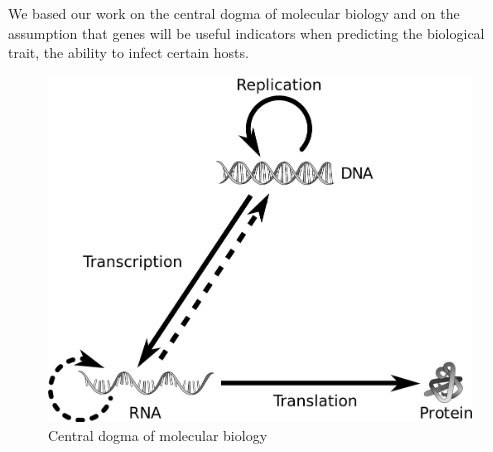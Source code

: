 We based our work on the central dogma of molecular biology and on the assumption that genes will be useful indicators when predicting the biological trait, the ability to infect certain hosts.

\begin{figure}[htp]
\includegraphics[width=\linewidth]{./images/central_dogma.png}
\centering
\caption{Central dogma of molecular biology}
\end{figure}
